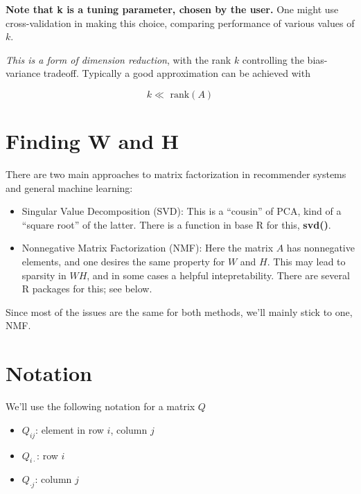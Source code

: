 \textbf{Note that k is a tuning parameter, chosen by the user.}  One
might use cross-validation in making this choice, comparing performance
of various values of $k$.

\textit{This is a form of dimension reduction}, with the rank $k$
controlling the bias-variance tradeoff.  Typically a good approximation
can be achieved with

\begin{equation}
k \ll \textrm{ rank}(A)
\end{equation}

\section{Finding W and H}

There are two main approaches to matrix factorization in recommender
systems and general machine learning:

\begin{itemize}

\item Singular Value Decomposition (SVD):  This is a ``cousin'' of PCA,
kind of a ``square root'' of the latter.  There is a function in base R
for this, \textbf{svd()}.

\item Nonnegative Matrix Factorization (NMF): Here the matrix $A$ has
nonnegative elements, and one desires the same property for $W$ and $H$.
This may lead to sparsity in $WH$, and in some cases a helpful
intepretability.  There are several R packages for this; see below.

\end{itemize} 

Since most of the issues are the same for both methods, we'll mainly stick
to one, NMF.

\section{Notation}

We'll use the following notation for a matrix $Q$

\begin{itemize}

\item $Q_{ij}$:  element in row $i$, column $j$

\item $Q_{i \cdot}$:  row $i$

\item $Q_{\cdot j}$:  column $j$

\end{itemize}

